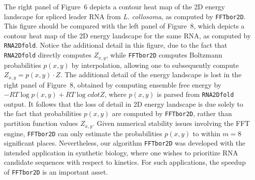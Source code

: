 The right panel of Figure~6 depicts a contour
heat map of the 2D energy landscape for spliced leader RNA from
{\em L. collosoma}, as computed by {\tt FFTbor2D}.
This figure should be compared with the left panel of
Figure~8, which depicts a contour heat map of the 2D energy landscape for
the same RNA, as computed by {\tt RNA2Dfold}.
Notice the additional detail in this figure, due
to the fact that {\tt RNA2Dfold} directly computes $Z_{x,y}$, while
{\tt FFTbor2D} computes Boltzmann probabilities $p(x,y)$ by interpolation,
allowing one to subsequently compute $Z_{x,y} = p(x,y) \cdot Z$.
The additional detail of the energy landscape is lost in the right panel of
Figure~8, obtained by computing ensemble free energy by
$-RT \log p(x,y) + RT \log cdot Z$, where $p(x,y)$ is parsed from
{\tt RNA2Dfold} output.  It follows that the loss of detail in
2D energy landscape is due solely to the fact that probabilities $p(x,y)$ are
computed by {\tt FFTbor2D}, rather than partition function values
$Z_{x,y}$. Given numerical stability issues involving the FFT engine,
{\tt FFTbor2D} can only estimate the probabilities $p(x,y)$ to within
$m=8$ significant places. Nevertheless, our algorithm {\tt FFTbor2D}
was developed with the intended application in synthetic biology, where
one wishes to prioritize RNA candidate sequences with respect to kinetics.
For such applications, the speedup of {\tt FFTbor2D} is an important asset.
